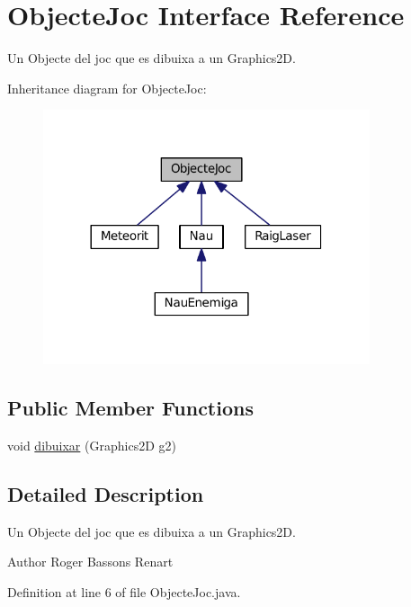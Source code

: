 \hypertarget{interface_objecte_joc}{}\section{Objecte\+Joc Interface Reference}
\label{interface_objecte_joc}


Un Objecte del joc que es dibuixa a un Graphics2\+D.  




Inheritance diagram for Objecte\+Joc\+:\nopagebreak
\begin{figure}[H]
\begin{center}
\leavevmode
\includegraphics[width=272pt]{interface_objecte_joc__inherit__graph}
\end{center}
\end{figure}
\subsection*{Public Member Functions}
\begin{DoxyCompactItemize}
\item 
void \hyperlink{interface_objecte_joc_a0d472e898df5faf145a2480ab51e3ef8}{dibuixar} (Graphics2\+D g2)
\end{DoxyCompactItemize}


\subsection{Detailed Description}
Un Objecte del joc que es dibuixa a un Graphics2\+D. 

\begin{DoxyAuthor}{Author}
Roger Bassons Renart 
\end{DoxyAuthor}


Definition at line 6 of file Objecte\+Joc.\+java.



